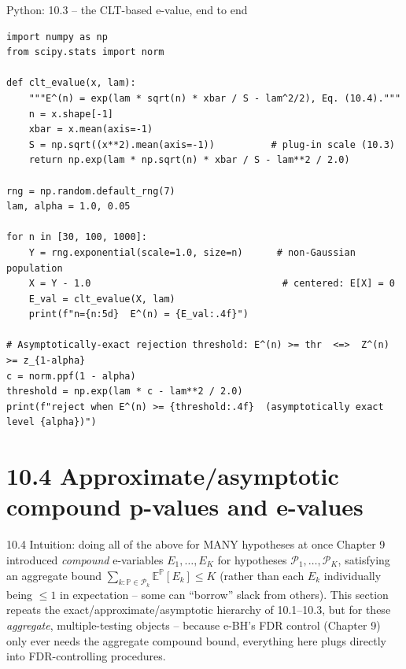 \documentclass[aspectratio=169,10pt]{beamer}
\newcommand{\E}{\mathbb{E}}
\newcommand{\Pb}{\mathbb{P}}
\newcommand{\calP}{\mathcal{P}}
\begin{document}
\begin{frame}[fragile]{Python: 10.3 -- the CLT-based e-value, end to end}
  \begin{lstlisting}
import numpy as np
from scipy.stats import norm

def clt_evalue(x, lam):
    """E^(n) = exp(lam * sqrt(n) * xbar / S - lam^2/2), Eq. (10.4)."""
    n = x.shape[-1]
    xbar = x.mean(axis=-1)
    S = np.sqrt((x**2).mean(axis=-1))          # plug-in scale (10.3)
    return np.exp(lam * np.sqrt(n) * xbar / S - lam**2 / 2.0)

rng = np.random.default_rng(7)
lam, alpha = 1.0, 0.05

for n in [30, 100, 1000]:
    Y = rng.exponential(scale=1.0, size=n)      # non-Gaussian population
    X = Y - 1.0                                  # centered: E[X] = 0
    E_val = clt_evalue(X, lam)
    print(f"n={n:5d}  E^(n) = {E_val:.4f}")

# Asymptotically-exact rejection threshold: E^(n) >= thr  <=>  Z^(n) >= z_{1-alpha}
c = norm.ppf(1 - alpha)
threshold = np.exp(lam * c - lam**2 / 2.0)
print(f"reject when E^(n) >= {threshold:.4f}  (asymptotically exact level {alpha})")
  \end{lstlisting}
\end{frame}

\section{10.4 Approximate/asymptotic compound p-values and e-values}

\begin{frame}{10.4 Intuition: doing all of the above for MANY hypotheses at once}
  Chapter 9 introduced \emph{compound} e-variables $E_1,\dots,E_K$ for hypotheses $\calP_1,\dots,\calP_K$, satisfying an aggregate bound $\sum_{k:\Pb\in\calP_k}\E^{\Pb}[E_k]\leq K$ (rather than each $E_k$ individually being $\leq1$ in expectation -- some can ``borrow'' slack from others). This section repeats the exact/approximate/asymptotic hierarchy of 10.1--10.3, but for these \emph{aggregate}, multiple-testing objects -- because e-BH's FDR control (Chapter 9) only ever needs the aggregate compound bound, everything here plugs directly into FDR-controlling procedures.
\end{frame}
\end{document}
